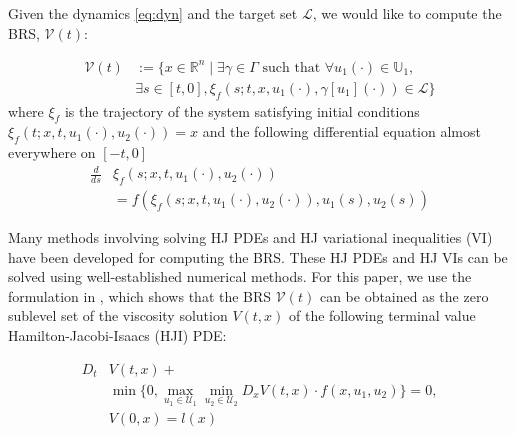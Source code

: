 Given the dynamics \eqref{eq:dyn} and the target set $\mathcal{L}$, we would like to compute the BRS, $\mathcal{V}(t)$:

\begin{equation}
\begin{aligned}
\mathcal{V}(t) &:= \{x\in\mathbb{R}^n \mid \exists \gamma\in\Gamma \text{ such that } \forall u_1(\cdot)\in\mathbb{U}_1, \\
&\exists s \in [t,0], \xi_f(s; t, x, u_1(\cdot), \gamma[u_1](\cdot)) \in \mathcal{L} \}
\end{aligned}
\end{equation}
where $\xi_f$ is the trajectory of the system satisfying initial conditions $\xi_f(t; x, t, u_1(\cdot), u_2(\cdot))=x$ and the following differential equation almost everywhere on $[-t, 0]$
\begin{equation}
\begin{aligned}
\frac{d}{ds}&\xi_f(s; x, t, u_1(\cdot), u_2(\cdot)) \\
&= f(\xi_f(s; x, t, u_1(\cdot), u_2(\cdot)), u_1(s), u_2(s))
\end{aligned}
\end{equation}

Many methods involving solving HJ PDEs \cite{Mitchell05} and HJ variational inequalities (VI) \cite{Bokanowski10,Barron89,Fisac15} have been developed for computing the BRS. These HJ PDEs and HJ VIs can be solved using well-established numerical methods. For this paper, we use the formulation in \cite{Mitchell05}, which shows that the BRS $\mathcal{V}(t)$ can be obtained as the zero sublevel set of the viscosity solution \cite{Crandall84} $V(t,x)$ of the following terminal value Hamilton-Jacobi-Isaacs (HJI) PDE:

\begin{equation} \label{eq:HJIPDE}
\begin{aligned}
D_t &V(t,x) + \\
&\min \{0, \max_{u_1\in\mathcal{U}_1} \min_{u_2\in\mathcal{U}_2} D_x V(t,x) \cdot f(x,u_1,u_2) \} = 0, \\
&V(0,x) = l(x)
\end{aligned}
\end{equation}

